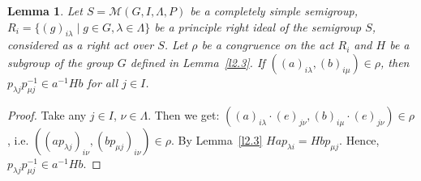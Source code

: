 \documentclass{birkau}
\numberwithin{equation}{section}
\theoremstyle{plain}
\newtheorem{lemma}[theorem]{Lemma}
\theoremstyle{definition}
\begin{document}
	\begin{lemma} \label{l2.4}
	    Let $S = \mathcal{M}(G,I,\Lambda,P)$ be a completely simple semigroup, $R_i = \{ (g)_{i \lambda} \mid g \in G, \lambda \in \Lambda \} $ be a principle right ideal of the semigroup $S$, considered as a right act over $S$. Let $\rho$ be a congruence on the act $R_i$ and $H$ be a subgroup of the group $G$ defined in Lemma~\ref{l2.3}. If $((a)_{i \lambda},(b)_{i \mu}) \in \rho$, then $p_{\lambda j}p_{\mu j}^{-1} \in a^{-1} H b$ for all $j \in I$.
	\end{lemma}
	\begin{proof}
	    Take any $j \in I$, $\nu \in \Lambda$. Then we get: $((a)_{i \lambda} \cdot (e)_{j \nu},(b)_{i \mu} \cdot (e)_{j \nu}) \in \rho$, i.e. $((ap_{\lambda j})_{i \nu},(bp_{\mu j})_{i \nu}) \in \rho$. By Lemma~\ref{l2.3} $H a p_{\lambda i} = H b p_{\mu j}$. Hence, $p_{\lambda j} p_{\mu j}^{-1} \in a^{-1} H b$.
	\end{proof}
	
\end{document}
